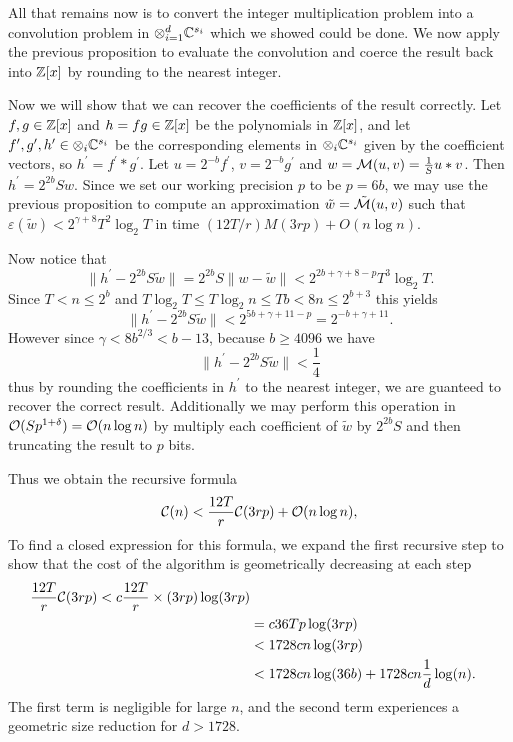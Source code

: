 All that remains now is to convert the integer multiplication problem into a convolution problem in $\otimes_{i=1}^d {\mathbb C}^{s_i}$ which we showed could be done. We now apply the previous proposition to evaluate the convolution and coerce the result back into ${\mathbb Z}[x]$ by rounding to the nearest integer.

Now we will show that we can recover the coefficients of the result correctly.
Let $f, g \in {\mathbb Z}[x]$ and $h = fg \in {\mathbb Z}[x]$ be the polynomials in ${\mathbb Z}[x]$, and let $f^\prime, g^\prime, h^\prime \in \otimes_i {\mathbb C}^{s_i}$ be the corresponding elements in $\otimes_i {\mathbb C}^{s_i}$ given by the coefficient vectors, so $h^\prime = f^\prime \ast g^\prime$. Let $u = 2^{-b}f^\prime$, $v = 2^{-b} g^\prime$ and $w = \mathcal M(u, v) = \frac{1}{S} u \ast v$. Then $h^\prime = 2^{2b}Sw$. Since we set our working precision $p$ to be $p = 6b$, we may use the previous proposition to compute an approximation $\tilde{w} = \tilde{\mathcal M}(u, v)$ such that $\varepsilon(\tilde{w}) < 2^{\gamma + 8} T^2 \log_2 T$ in time $(12T/r)M(3rp) + O(n \log n)$.

Now notice that
\[
    \|h^\prime - 2^{2b}S\tilde{w}\| = 2^{2b}S\|w - \tilde{w}\| < 2^{2b + \gamma + 8 - p} T^3 \log_2 T.
\]
Since $T < n \le 2^b$ and $T \log _2 T \le T \log_2 n \le Tb < 8n \le 2^{b+3}$ this yields
\[
    \|h^\prime - 2^{2b}S\tilde{w}\| < 2^{5b + \gamma + 11 - p} = 2^{-b + \gamma + 11}.
\]
However since $\gamma < 8b^{2/3} < b - 13$, because $b \ge 4096$ we have 
\[
    \| h^\prime - 2^{2b}S \tilde{w} \| < \frac{1}{4}
\]
thus by rounding the coefficients in $h^\prime$ to the nearest integer, we are guanteed to recover the correct result. Additionally we may perform this operation in $\mathcal O(Sp^{1 + \delta}) = \mathcal O(n \log n)$ by multiply each coefficient of $\tilde{w}$ by $2^{2b}S$ and then truncating the result to $p$ bits.

Thus we obtain the recursive formula
\[
    \mathcal C(n) < \frac{12T}{r} \mathcal C(3rp) + \mathcal O(n \log n),
\]
To find a closed expression for this formula, we expand the first recursive step to show that the cost of the algorithm is geometrically decreasing at each step
\begin{align*}
    \frac{12T}{r} \mathcal C(3rp) < c\frac{12T}{r} \times (3rp) \log(3rp)\\
        &= c36Tp\log (3rp)\\
        &< 1728cn \log (3rp)\\
        &< 1728cn\log(36b) + 1728cn \frac{1}{d}\log(n).
\end{align*}
The first term is negligible for large $n$, and the second term experiences a geometric size reduction for $d > 1728$.


